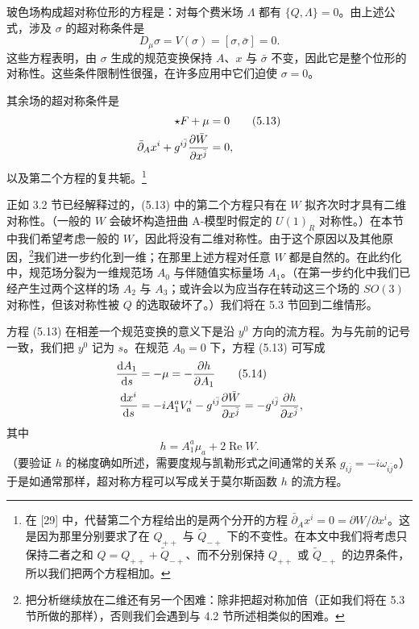 \documentclass[11pt,a4paper,UTF8]{ctexart}
\theoremstyle{plain}
\theoremstyle{definition}
\begin{document}
玻色场构成超对称位形的方程是：对每个费米场 $\Lambda$ 都有 $\{Q,\Lambda\}=0$。由上述公式，涉及 $\sigma$ 的超对称条件是
\begin{equation}
    D_\mu\sigma=V(\sigma)=[\sigma,\bar\sigma]=0.
    \tag{5.12}
\end{equation}
这些方程表明，由 $\sigma$ 生成的规范变换保持 $A$、$x$ 与 $\bar\sigma$ 不变，因此它是整个位形的对称性。这些条件限制性很强，在许多应用中它们迫使 $\sigma=0$。

其余场的超对称条件是
\begin{align}
    \star F+\mu&=0 \tag{5.13}\\
    \bar\partial_Ax^i+g^{i\bar j}\frac{\partial\bar W}{\partial x^{\bar j}}&=0, \notag
\end{align}
以及第二个方程的复共轭。\footnote{在 [29] 中，代替第二个方程给出的是两个分开的方程 $\bar\partial_Ax^i=0=\partial W/\partial x^i$。这是因为那里分别要求了在 $Q_{++}$ 与 $\tilde Q_{-+}$ 下的不变性。在本文中我们将考虑只保持二者之和 $Q=Q_{++}+\tilde Q_{-+}$、而不分别保持 $Q_{++}$ 或 $\tilde Q_{-+}$ 的边界条件，所以我们把两个方程相加。}


正如 3.2 节已经解释过的，(5.13) 中的第二个方程只有在 $W$ 拟齐次时才具有二维对称性。（一般的 $W$ 会破坏构造扭曲 A-模型时假定的 $U(1)_R$ 对称性。）在本节中我们希望考虑一般的 $W$，因此将没有二维对称性。由于这个原因以及其他原因，\footnote{把分析继续放在二维还有另一个困难：除非把超对称加倍（正如我们将在 5.3 节所做的那样），否则我们会遇到与 4.2 节所述相类似的困难。}我们进一步约化到一维；在那里上述方程对任意 $W$ 都是自然的。在此约化中，规范场分裂为一维规范场 $A_0$ 与伴随值实标量场 $A_1$。（在第一步约化中我们已经产生过两个这样的场 $A_2$ 与 $A_3$；或许会以为应当存在转动这三个场的 $SO(3)$ 对称性，但该对称性被 $Q$ 的选取破坏了。）我们将在 5.3 节回到二维情形。

方程 (5.13) 在相差一个规范变换的意义下是沿 $y^0$ 方向的流方程。为与先前的记号一致，我们把 $y^0$ 记为 $s$。在规范 $A_0=0$ 下，方程 (5.13) 可写成
\begin{align}
    \frac{\mathrm dA_1}{\mathrm ds}&=-\mu=-\frac{\partial h}{\partial A_1} \tag{5.14}\\
    \frac{\mathrm dx^i}{\mathrm ds}&=-iA_1^aV_a^i-g^{i\bar j}\frac{\partial\bar W}{\partial x^{\bar j}}
    =-g^{i\bar j}\frac{\partial h}{\partial x^{\bar j}}, \notag
\end{align}
其中
\begin{equation}
    h=A_1^a\mu_a+2\operatorname{Re}W.
    \tag{5.15}
\end{equation}
（要验证 $h$ 的梯度确如所述，需要度规与凯勒形式之间通常的关系 $g_{i\bar j}=-i\omega_{i\bar j}$。）于是如通常那样，超对称方程可以写成关于莫尔斯函数 $h$ 的流方程。
\end{document}
